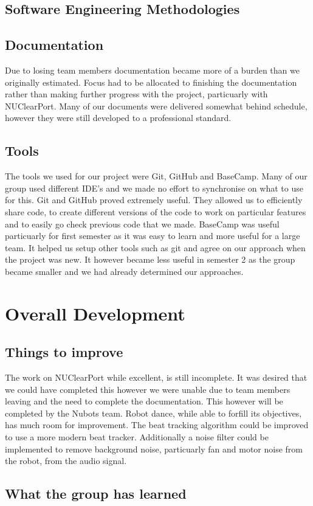 \documentclass[a4paper]{article}
\begin{document}
	\subsection{Software Engineering Methodologies}
		
	\subsection{Documentation}
		Due to losing team members documentation became more of a burden than we originally estimated. Focus had to be allocated to finishing the documentation rather than making further progress with the project, particuarly with NUClearPort. Many of our documents were delivered somewhat behind schedule, however they were still developed to a professional standard.
	\subsection{Tools}
		The tools we used for our project were Git, GitHub and BaseCamp. Many of our group used different IDE's and we made no effort to synchronise on what to use for this. Git and GitHub proved extremely useful. They allowed us to efficiently share code, to create different versions of the code to work on particular features and to easily go check previous code that we made. BaseCamp was useful particuarly for first semester as it was easy to learn and more useful for a large team. It helped us setup other tools such as git and agree on our approach when the project was new. It however became less useful in semester 2 as the group became smaller and we had already determined our approaches.
\section{Overall Development}
	\subsection{Things to improve}
		The work on NUClearPort while excellent, is still incomplete. It was desired that we could have completed this however we were unable due to team members leaving and the need to complete the documentation. This however will be completed by the Nubots team.
		Robot dance, while able to forfill its objectives, has much room for improvement. The beat tracking algorithm could be improved to use a more modern beat tracker. Additionally a noise filter could be implemented to remove background noise, particuarly fan and motor noise from the robot, from the audio signal.
	\subsection{What the group has learned}
\end{document}
